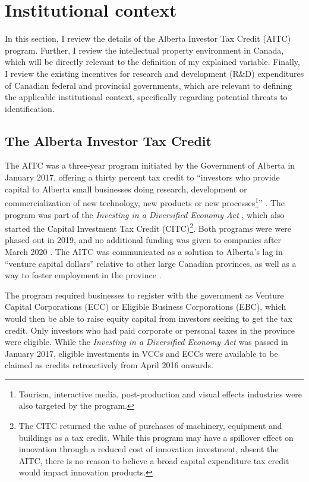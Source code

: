 \documentclass[../main.tex]{subfiles}
\begin{document}
\section{Institutional context}
\label{sec:institutional_background}

In this section, I review the details of the Alberta Investor Tax Credit (AITC) program. Further, I review the intellectual property environment in Canada, which will be directly relevant to the definition of my explained variable. Finally, I review the existing incentives for research and development (R\&D) expenditures of Canadian federal and provincial governments, which are relevant to defining the applicable institutional context, specifically regarding potential threats to identification.

\subsection{The Alberta Investor Tax Credit}

The AITC was a three-year program initiated by the Government of Alberta in January 2017, offering a thirty percent tax credit to \enquote{investors who provide capital to Alberta small businesses doing research, development or commercialization of new technology, new products or new processes\footnote{Tourism, interactive media, post-production and visual effects industries were also targeted by the program.}} \parencite[p.1]{albertaeconomicdevelopmentandtrade17}. The program was part of the \textit{Investing in a Diversified Economy Act} \nocite{Investing16}, which also started the Capital Investment Tax Credit (CITC)\footnote{The CITC returned the value of purchases of machinery, equipment and buildings as a tax credit. While this program may have a spillover effect on innovation through a reduced cost of innovation investment, absent the AITC, there is no reason to believe a broad capital expenditure tax credit would impact innovation products.}. Both programs were were phased out in 2019, and no additional funding was given to companies after March 2020 \parencite{albertaeconomicdevelopmentandtrade19}. The AITC was communicated as a solution to Alberta's lag in \enquote{venture capital dollars} \parencite[p.1]{albertaeconomicdevelopmentandtrade17} relative to other large Canadian provinces, as well as a way to foster employment in the province \parencite{zabjeck16}.

The program required businesses to register with the government as Venture Capital Corporations (ECC) or Eligible Business Corporations (EBC), which would then be able to raise equity capital from investors seeking to get the tax credit. Only investors who had paid corporate or personal taxes in the province were eligible. While the \textit{Investing in a Diversified Economy Act} was passed in January 2017, eligible investments in VCCs and ECCs were available to be claimed as credits retroactively from April 2016 onwards.
\end{document}
